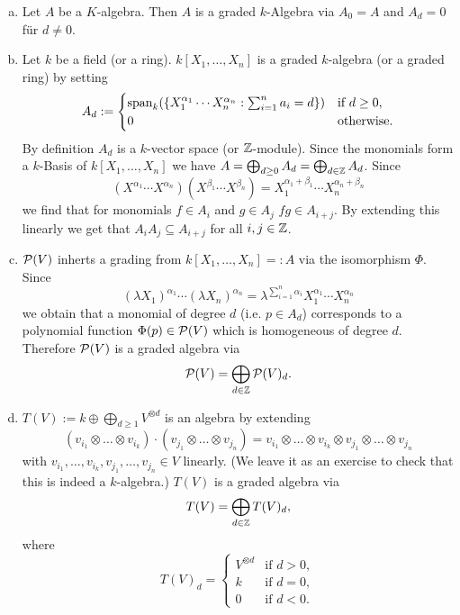 \begin{expls}\leavevmode
 \begin{enumerate}[a)]
  \item
  Let $A$ be a $K$-algebra. Then $A$ is a graded $k$-Algebra via $A_0 = A$ and $A_d = 0$ für $d \neq 0$.
  
  \item
  Let $k$ be a field (or a ring). $k[X_1, \ldots, X_n]$ is a graded $k$-algebra (or a graded ring) by setting
  \[
   A_d :=
   \begin{cases}
    \operatorname{span}_k(\{X_1^{\alpha_1} \cdots X_n^{\alpha_n} : \sum_{i=1}^n a_i = d\}) & \text{if } d \geq 0, \\
    0                                                                         & \text{otherwise}.
   \end{cases}
  \]
  By definition $A_d$ is a $k$-vector space (or $\mathbb{Z}$-module). Since the monomials form a $k$-Basis of $k[X_1, \ldots, X_n]$ we have $A = \bigoplus_{d \geq 0} A_d = \bigoplus_{d \in \mathbb{Z}} A_d$. Since
  \[
   \left( X^{\alpha_1} \cdots X^{\alpha_n} \right) \left( X^{\beta_1} \cdots X^{\beta_n} \right)
   = X_1^{\alpha_1+\beta_1} \cdots X_n^{\alpha_n+\beta_n}
  \]
  we find that for monomials $f \in A_i$ and $g \in A_j$ $fg \in A_{i+j}$. By extending this linearly we get that $A_i A_j \subseteq A_{i+j}$ for all $i,j \in \mathbb{Z}$.
  
  \item
  $\mathcal{P}(V)$ inherts a grading from $k[X_1, \ldots, X_n] =: A$ via the isomorphism $\Phi$. Since
  \[
   (\lambda X_1)^{\alpha_1} \cdots (\lambda X_n)^{\alpha_n}
   = \lambda^{\sum_{i=1}^n \alpha_i} X_1^{\alpha_1} \cdots X_n^{\alpha_n}
  \]
  we obtain that a monomial of degree $d$ (i.e. $p \in A_d$) corresponds to a polynomial function $\Phi(p) \in \mathcal{P}(V)$ which is homogeneous of degree $d$. Therefore $\mathcal{P}(V)$ is a graded algebra via
  \[
   \mathcal{P}(V) = \bigoplus_{d \in \mathbb{Z}} \mathcal{P}(V)_d.
  \]
  
  \item
  $T(V) := k \oplus \bigoplus_{d \geq 1} V^{\otimes d}$ is an algebra by extending
  \[
   (v_{i_1} \otimes \ldots \otimes v_{i_k}) \cdot (v_{j_1} \otimes \ldots \otimes v_{j_n})
   = v_{i_1} \otimes \ldots \otimes v_{i_k} \otimes v_{j_1} \otimes \ldots \otimes v_{j_n}
  \]
  with $v_{i_1}, \ldots, v_{i_k}, v_{j_1}, \ldots, v_{j_n} \in V$ linearly. (We leave it as an exercise to check that this is indeed a $k$-algebra.) $T(V)$ is a graded algebra via
  \[
   T(V) = \bigoplus_{d \in \mathbb{Z}} T(V)_d,
  \]
  where
  \[
   T(V)_d =
   \begin{cases}
    V^{\otimes d} & \text{if } d > 0, \\
    k             & \text{if } d = 0, \\
    0             & \text{if } d < 0.
   \end{cases}
  \]
 \end{enumerate}
\end{expls}


